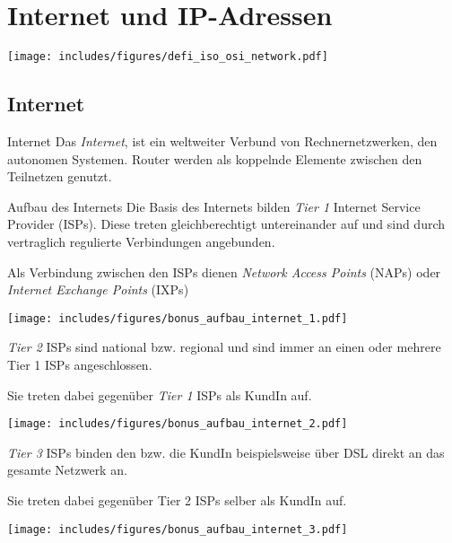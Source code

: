 \section{Internet und IP-Adressen}

\texttt{[image: includes/figures/defi\_iso\_osi\_network.pdf]}

\subsection{Internet}

\begin{defi}{Internet}
    Das \emph{Internet}, ist ein weltweiter Verbund von Rechnernetzwerken, den autonomen Systemen.
    Router werden als koppelnde Elemente zwischen den Teilnetzen genutzt.
\end{defi}

\begin{bonus}{Aufbau des Internets}
    Die Basis des Internets bilden \emph{Tier 1} Internet Service Provider (ISPs).
    Diese treten gleichberechtigt untereinander auf und sind durch vertraglich regulierte Verbindungen angebunden.
    
    Als Verbindung zwischen den ISPs dienen \emph{Network Access Points} (NAPs) oder \emph{Internet Exchange Points} (IXPs)
    
    \begin{center}
        \texttt{[image: includes/figures/bonus\_aufbau\_internet\_1.pdf]}
    \end{center}
    
    \emph{Tier 2} ISPs sind national bzw. regional und sind immer an einen oder mehrere Tier 1 ISPs angeschlossen.
    
    Sie treten dabei gegenüber \emph{Tier 1} ISPs als KundIn auf.
    
    \begin{center}
        \texttt{[image: includes/figures/bonus\_aufbau\_internet\_2.pdf]}
    \end{center}
    
    \emph{Tier 3} ISPs binden den bzw. die KundIn beispielsweise über DSL direkt an das gesamte Netzwerk an.
    
    Sie treten dabei gegenüber Tier 2 ISPs selber als KundIn auf.
    
    \begin{center}
        \texttt{[image: includes/figures/bonus\_aufbau\_internet\_3.pdf]}
    \end{center}
\end{bonus}

